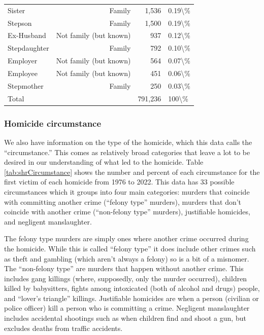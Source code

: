 \documentclass[
  12pt,
  openany]{book}
\begin{document}
\begin{longtable}[t]{lrrl}
Sister & Family & 1,536 & 0.19\textbackslash{}\%\\
Stepson & Family & 1,500 & 0.19\textbackslash{}\%\\
Ex-Husband & Not family (but known) & 937 & 0.12\textbackslash{}\%\\
\addlinespace
Stepdaughter & Family & 792 & 0.10\textbackslash{}\%\\
Employer & Not family (but known) & 564 & 0.07\textbackslash{}\%\\
Employee & Not family (but known) & 451 & 0.06\textbackslash{}\%\\
Stepmother & Family & 250 & 0.03\textbackslash{}\%\\
Total &  & 791,236 & 100\textbackslash{}\%\\
\bottomrule
\end{longtable}

\subsubsection{Homicide circumstance}\label{circumstance}

We also have information on the type of the homicide, which this data calls the ``circumstance.'' This comes as relatively broad categories that leave a lot to be desired in our understanding of what led to the homicide. Table \ref{tab:shrCircumstance} shows the number and percent of each circumstance for the first victim of each homicide from 1976 to 2022. This data has 33 possible circumstances which it groups into four main categories: murders that coincide with committing another crime (``felony type'' murders), murders that don't coincide with another crime (``non-felony type'' murders), justifiable homicides, and negligent manslaughter.

The felony type murders are simply ones where another crime occurred during the homicide. While this is called ``felony type'' it does include other crimes such as theft and gambling (which aren't always a felony) so is a bit of a misnomer. The ``non-felony type'' are murders that happen without another crime. This includes gang killings (where, supposedly, only the murder occurred), children killed by babysitters, fights among intoxicated (both of alcohol and drugs) people, and ``lover's triangle'' killings. Justifiable homicides are when a person (civilian or police officer) kill a person who is committing a crime. Negligent manslaughter includes accidental shootings such as when children find and shoot a gun, but excludes deaths from traffic accidents.
\end{document}
